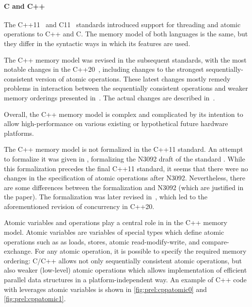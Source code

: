 \paragraph{C and C++}
%
The C++11~ and C11~ standards
introduced support for threading and atomic operations to C++ and C.
The memory model of both languages is the same, but they differ in the
syntactic ways in which its features are used.

The C++ memory model was revised in the subsequent standards, with the most
notable changes in the C++20~, including changes to the strongest sequentially-consistent version of atomic operations.
These latest changes mostly remedy problems in interaction between the
sequentially consistent operations and weaker memory orderings presented
in~.
The actual changes are described in~.

Overall, the C++ memory model is complex and complicated by its intention to
allow high-performance on various existing or hypothetical future hardware
platforms.

The C++ memory model is not formalized in the C++11 standard.
An attempt to formalize it was given in , formalizing the
N3092 draft of the standard \cite{N3092}.
While this formalization precedes the final C++11 standard, it seems that there were no changes in the specification of atomic operations after N3092.
Nevertheless, there are some differences between the formalization and N3092
(which are justified in the paper).
The formalization was later revised in~, which led to the aforementioned revision of concurrency in C++20.

Atomic variables and operations play a central role in in the C++ memory model.
Atomic variables are variables of special types which define atomic operations
such as as loads, stores, atomic read-modify-write, and compare-exchange.
For any atomic operation, it is possible to specify the required memory
ordering: C/C++ allows not only sequentially consistent atomic operations, but
also weaker (low-level) atomic operations which allows implementation of
efficient parallel data structures in a platform-independent way.
An example of C++ code with leverages atomic variables is shown in \autoref{fig:prel:cppatomic0} and \autoref{fig:prel:cppatomic1}.

